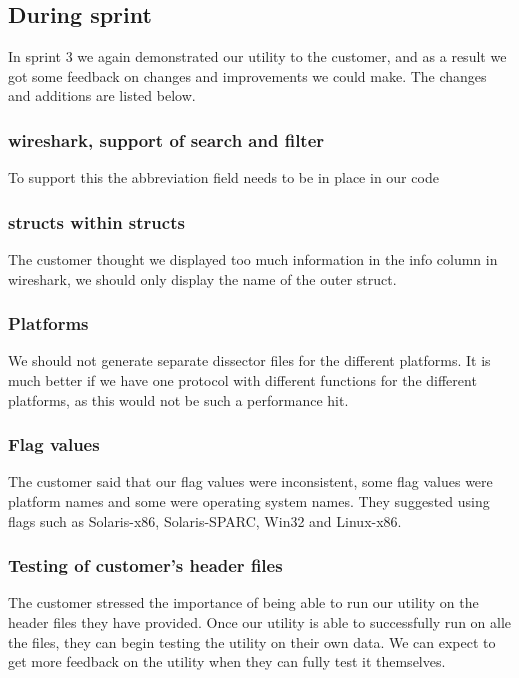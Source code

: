 \subsection{During sprint}
In sprint 3 we again demonstrated our \gls{utility} to the customer, and as a result we got some feedback on changes
and improvements we could make. The changes and additions are listed below.

\subsubsection{\Gls{wireshark}, support of search and filter}
To support this the abbreviation field needs to be in place in our code

\subsubsection{\Glspl{struct} within \glspl{struct}}
The customer thought we displayed too much information in the info column in \Gls{wireshark},
 we should only display the name of the outer \gls{struct}.

\subsubsection{Platforms}
We should not generate separate \gls{dissector} files for the different platforms. It is much better if we have one \gls{protocol}
with different functions for the different platforms, as this would not be such a performance hit.

\subsubsection{Flag values}
The customer said that our flag values were inconsistent, some flag values were platform names and some were operating
system names. They suggested using flags such as Solaris-x86, Solaris-SPARC, Win32 and Linux-x86.

\subsubsection{Testing of customer's \gls{header} files}
The customer stressed the importance of being able to run our \gls{utility} on the \gls{header} files they have provided.
Once our \gls{utility} is able to successfully run on alle the files, they can begin testing the \gls{utility} on their own data.
We can expect to get more feedback on the \gls{utility} when they can fully test it themselves.

